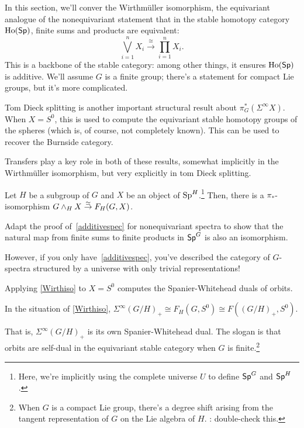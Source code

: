 In this section, we'll conver the Wirthmüller isomorphism, the equivariant analogue of the nonequivariant statement
that in the stable homotopy category $\operatorname{Ho}(\mathsf{Sp})$, finite sums and products are equivalent:
\begin{equation}
\label{additivespec}
\bigvee_{i=1}^n X_i\stackrel\cong\longrightarrow \prod_{i=1}^n X_i.
\end{equation}
This is a backbone of the stable category: among other things, it ensures $\operatorname{Ho}(\mathsf{Sp})$ is additive. We'll assume $G$
is a finite group; there's a statement for compact Lie groups, but it's more complicated.

Tom Dieck splitting is another important structural result about $\pi_G^*(\Sigma^\infty X)$. When $X = S^0$, this
is used to compute the equivariant stable homotopy groups of the spheres (which is, of course, not completely
known). This can be used to recover the Burnside category.

Transfers play a key role in both of these results, somewhat implicitly in the Wirthmüller isomorphism, but very
explicitly in tom Dieck splitting.
\begin{thm}
\label{Wirthiso}
Let $H$ be a subgroup of $G$ and $X$ be an object of $\mathrm{Sp}^H$.\footnote{Here, we're implicitly using the complete
universe $U$ to define $\mathsf{Sp}^G$ and $\mathsf{Sp}^H$.} Then, there is a $\pi_*$-isomorphism
$G\wedge_H X\stackrel\simeq\to F_H(G,X)$.
\end{thm}
\begin{ex}
Adapt the proof of~\eqref{additivespec} for nonequivariant spectra to show that the natural map from finite sums to
finite products in $\mathsf{Sp}^G$ is also an isomorphism.
\end{ex}
However, if you only have~\eqref{additivespec}, you've described the category of $G$-spectra structured by a
universe with only trivial representations!

Applying \cref{Wirthiso} to $X = S^0$ computes the Spanier-Whitehead duals of orbits.
\begin{cor}
\label{wirthcor}
In the situation of \cref{Wirthiso}, $\Sigma^\infty(G/H)_+\cong F_H(G,S^0)\cong F((G/H)_+, S^0)$.
\end{cor}
That is, $\Sigma^\infty (G/H)_+$ is its own Spanier-Whitehead dual. The slogan is that orbits are self-dual in the
equivariant stable category when $G$ is finite.\footnote{When $G$ is a compact Lie group, there's a degree shift
arising from the tangent representation of $G$ on the Lie algebra of $H$. \TODO: double-check
this.}

